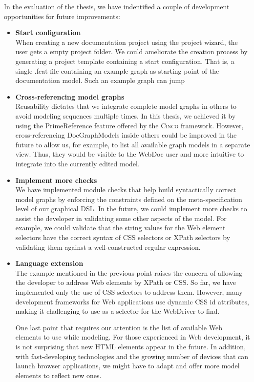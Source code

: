 In the evaluation of the thesis, we have indentified a couple of development opportunities for future improvements:
\begin{itemize}
    \item \textbf{Start configuration}\\
        When creating a new documentation project using the project wizard, the user gets a empty project folder. We could ameliorate the creation process by generating a project template containing a start configuration. That is, a single .feat file containing an example graph as starting point of the documentation model. Such an example graph can jump
    \item \textbf{Cross-referencing model graphs}\\
        Reusability dictates that we integrate complete model graphs in others to avoid modeling sequences multiple times. In this thesis, we achieved it by using the PrimeReference feature offered by the \textsc{Cinco} framework. However, cross-referencing DocGraphModels inside others could be improved in the future to allow us, for example, to list all available graph models in a separate view. Thus, they would be visible to the WebDoc user and more intuitive to integrate into the currently edited model.
    \item \textbf{Implement more checks}\\
        We have implemented module checks that help build syntactically correct model graphs by enforcing the constraints defined on the meta-specification level of our graphical DSL. In the future, we could implement more checks to assist the developer in validating some other aspects of the model. For example, we could validate that the string values for the Web element selectors have the correct syntax of CSS selectors or XPath selectors by validating them against a well-constructed regular expression.
    \item \textbf{Language extension}\\
        The example mentioned in the previous point raises the concern of allowing the developer to address Web elements by XPath or CSS. So far, we have implemented only the use of CSS selectors to address them. However, many development frameworks for Web applications use dynamic CSS id attributes, making it challenging to use as a selector for the WebDriver to find. 

        One last point that requires our attention is the list of available Web elements to use while modeling. For those experienced in Web development, it is not surprising that new HTML elements appear in the future. In addition, with fast-developing technologies and the growing number of devices that can launch browser applications, we might have to adapt and offer more model elements to reflect new ones.
\end{itemize}
